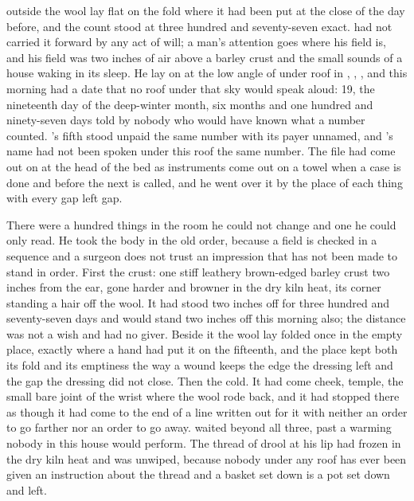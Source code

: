 
 outside the wool lay flat on the fold where it had been put at the close of the day before, and the count stood at three hundred and seventy-seven exact.  had not carried it forward by any act of will; a man's attention goes where his field is, and his field was two inches of air above a barley crust and the small sounds of a house waking in its sleep. He lay on  at the low angle of  under  roof in , , , and this morning had a date that no roof under that sky would speak aloud:  19, the nineteenth day of the deep-winter month, six months and one hundred and ninety-seven days told by nobody who would have known what a number counted. 's fifth stood unpaid the same number with its payer unnamed, and 's name had not been spoken under this roof the same number. The file had come out on  at the head of the bed as instruments come out on a towel when a case is done and before the next is called, and he went over it by the place of each thing with every gap left gap.

There were a hundred things in the room he could not change and one he could only read. He took the body in the old order, because a field is checked in a sequence and a surgeon does not trust an impression that has not been made to stand in order. First the crust: one stiff leathery brown-edged barley crust two inches from the ear, gone harder and browner in the dry kiln heat, its corner standing a hair off the wool. It had stood two inches off for three hundred and seventy-seven days and would stand two inches off this morning also; the distance was not a wish and had no giver. Beside it the wool lay folded once in the empty place, exactly where a hand had put it on the fifteenth, and the place kept both its fold and its emptiness the way a wound keeps the edge the dressing left and the gap the dressing did not close. Then the cold. It had come cheek, temple, the small bare joint of the wrist where the wool rode back, and it had stopped there as though it had come to the end of a line written out for it with neither an order to go farther nor an order to go away.  waited beyond all three, past a warming nobody in this house would perform. The thread of drool at his lip had frozen in the dry kiln heat and was unwiped, because nobody under any roof has ever been given an instruction about the thread and a basket set down is a pot set down and left.

